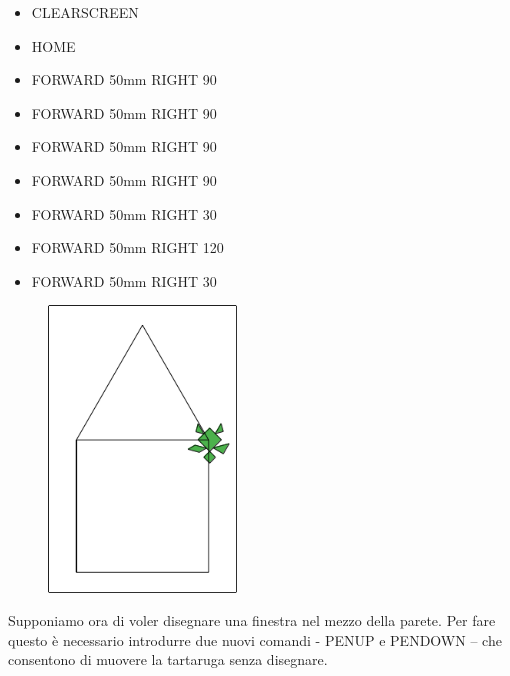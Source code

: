 \begin{scriptsize}
\begin{minipage}{0.40\textwidth}
\begin{itemize}[itemsep=-3pt,parsep=2pt]
\item[] CLEARSCREEN             
\item[] HOME
\item[] FORWARD 50mm RIGHT 90
\item[] FORWARD 50mm RIGHT 90
\item[] FORWARD 50mm RIGHT 90
\item[] FORWARD 50mm RIGHT 90
\item[] FORWARD 50mm RIGHT 30
\item[] FORWARD 50mm RIGHT 120
\item[] FORWARD 50mm RIGHT 30
\end{itemize}
\end{minipage}
\end{scriptsize}
\begin{minipage}{0.4\textwidth}
\begin{figure}[H]
   \includegraphics[width=5.0cm,trim=4 4 8 4,clip]{./images/disegnare/disegnare-7.png}
   \label{dis-7}
\end{figure}
\end{minipage} \hfill

\vskip 1cm

Supponiamo ora di voler disegnare una finestra nel mezzo della parete. Per fare questo è necessario introdurre due nuovi comandi - PENUP e PENDOWN – che consentono di muovere la tartaruga senza disegnare.

\vskip 1cm

